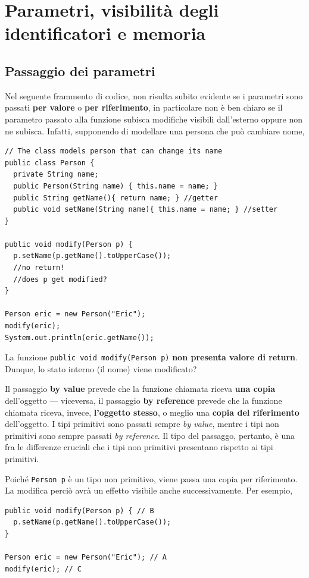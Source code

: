 \documentclass[\fontsizeclass,twocolumn]{\classname}
\theoremstyle{definition}
\theoremstyle{definition}
\begin{document}
\chapter{Parametri, visibilità degli identificatori e memoria}
\section{Passaggio dei parametri}

Nel seguente frammento di codice, non risulta subito evidente se i parametri
sono passati \textbf{per valore} o \textbf{per riferimento}, in particolare non
è ben chiaro se il parametro passato alla funzione subisca modifiche visibili
dall'esterno oppure non ne subisca. Infatti, supponendo di modellare una
persona che può cambiare nome,

\begin{lstlisting}
// The class models person that can change its name
public class Person {
  private String name;
  public Person(String name) { this.name = name; }
  public String getName(){ return name; } //getter
  public void setName(String name){ this.name = name; } //setter
}

public void modify(Person p) {
  p.setName(p.getName().toUpperCase());
  //no return!
  //does p get modified?
}

Person eric = new Person("Eric");
modify(eric);
System.out.println(eric.getName());
\end{lstlisting}

La funzione \texttt{public void modify(Person p)} \textbf{non presenta valore
di return}. Dunque, lo stato interno (il nome) viene modificato?

Il passaggio \textbf{by value} prevede che la funzione chiamata riceva
\textbf{una copia} dell'oggetto \---- viceversa, il passaggio \textbf{by
reference} prevede che la funzione chiamata riceva, invece, \textbf{l'oggetto
stesso}, o meglio una \textbf{copia del riferimento} dell'oggetto. I tipi
primitivi sono passati sempre \emph{by value}, mentre i tipi non primitivi sono
sempre passati \emph{by reference}. Il tipo del passaggo, pertanto, è una fra
le differenze cruciali che i tipi non primitivi presentano rispetto ai tipi
primitivi.

Poiché \texttt{Person p} è un tipo non primitivo, viene passa una copia per
riferimento. La modifica perciò avrà un effetto visibile anche successivamente.
Per esempio,

\begin{lstlisting}
public void modify(Person p) { // B
  p.setName(p.getName().toUpperCase());
}

Person eric = new Person("Eric"); // A
modify(eric); // C
\end{lstlisting}
\end{document}
